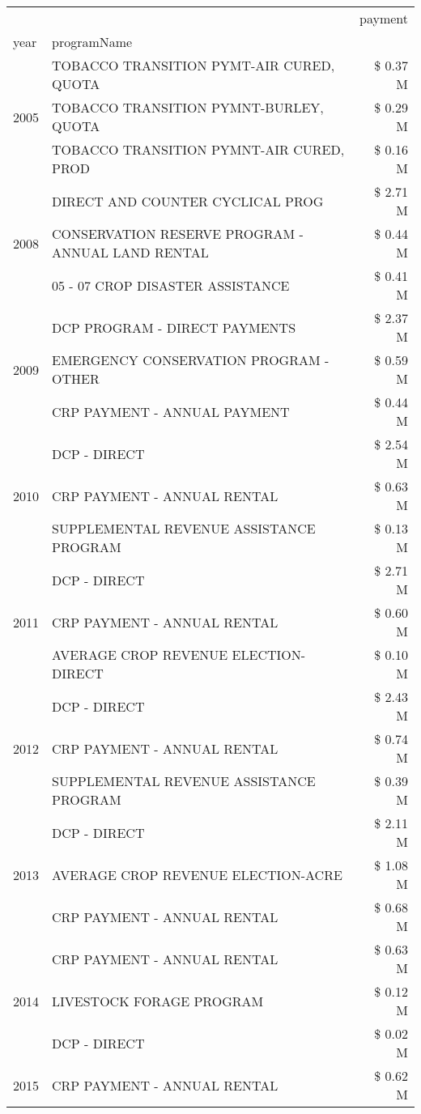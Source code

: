 \begin{tabular}{llr}
\toprule
 &  & payment \\
year & programName &  \\
\midrule
\multirow[t]{3}{*}{2005} & TOBACCO TRANSITION PYMT-AIR CURED, QUOTA & \$ 0.37 M \\
 & TOBACCO TRANSITION PYMNT-BURLEY, QUOTA & \$ 0.29 M \\
 & TOBACCO TRANSITION PYMNT-AIR CURED, PROD & \$ 0.16 M \\
\cline{1-3}
\multirow[t]{3}{*}{2008} & DIRECT AND COUNTER CYCLICAL PROG & \$ 2.71 M \\
 & CONSERVATION RESERVE PROGRAM - ANNUAL LAND RENTAL & \$ 0.44 M \\
 & 05 - 07 CROP DISASTER ASSISTANCE & \$ 0.41 M \\
\cline{1-3}
\multirow[t]{3}{*}{2009} & DCP PROGRAM - DIRECT PAYMENTS & \$ 2.37 M \\
 & EMERGENCY CONSERVATION PROGRAM - OTHER & \$ 0.59 M \\
 & CRP PAYMENT - ANNUAL PAYMENT & \$ 0.44 M \\
\cline{1-3}
\multirow[t]{3}{*}{2010} & DCP - DIRECT & \$ 2.54 M \\
 & CRP PAYMENT - ANNUAL RENTAL & \$ 0.63 M \\
 & SUPPLEMENTAL REVENUE ASSISTANCE PROGRAM & \$ 0.13 M \\
\cline{1-3}
\multirow[t]{3}{*}{2011} & DCP - DIRECT & \$ 2.71 M \\
 & CRP PAYMENT - ANNUAL RENTAL & \$ 0.60 M \\
 & AVERAGE CROP REVENUE ELECTION-DIRECT & \$ 0.10 M \\
\cline{1-3}
\multirow[t]{3}{*}{2012} & DCP - DIRECT & \$ 2.43 M \\
 & CRP PAYMENT - ANNUAL RENTAL & \$ 0.74 M \\
 & SUPPLEMENTAL REVENUE ASSISTANCE PROGRAM & \$ 0.39 M \\
\cline{1-3}
\multirow[t]{3}{*}{2013} & DCP - DIRECT & \$ 2.11 M \\
 & AVERAGE CROP REVENUE ELECTION-ACRE & \$ 1.08 M \\
 & CRP PAYMENT - ANNUAL RENTAL & \$ 0.68 M \\
\cline{1-3}
\multirow[t]{3}{*}{2014} & CRP PAYMENT - ANNUAL RENTAL & \$ 0.63 M \\
 & LIVESTOCK FORAGE PROGRAM & \$ 0.12 M \\
 & DCP - DIRECT & \$ 0.02 M \\
\cline{1-3}
\multirow[t]{3}{*}{2015} & CRP PAYMENT - ANNUAL RENTAL & \$ 0.62 M \\

\end{tabular}
